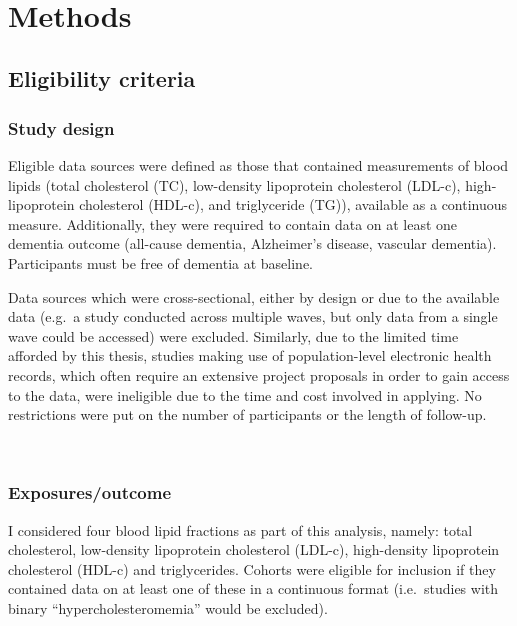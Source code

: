 \documentclass[a4paper, twoside]{templates/ociamthesis}
\begin{document}
~

\hypertarget{methods-2}{%
\section{Methods}\label{methods-2}}

\hypertarget{eligibility-criteria}{%
\subsection{Eligibility criteria}\label{eligibility-criteria}}

\hypertarget{study-design}{%
\subsubsection{Study design}\label{study-design}}

Eligible data sources were defined as those that contained measurements of blood lipids (total cholesterol (TC), low-density lipoprotein cholesterol (LDL-c), high-lipoprotein cholesterol (HDL-c), and triglyceride (TG)), available as a continuous measure. Additionally, they were required to contain data on at least one dementia outcome (all-cause dementia, Alzheimer's disease, vascular dementia). Participants must be free of dementia at baseline.

Data sources which were cross-sectional, either by design or due to the available data (e.g.~a study conducted across multiple waves, but only data from a single wave could be accessed) were excluded. Similarly, due to the limited time afforded by this thesis, studies making use of population-level electronic health records, which often require an extensive project proposals in order to gain access to the data, were ineligible due to the time and cost involved in applying. No restrictions were put on the number of participants or the length of follow-up.

~

\hypertarget{exposuresoutcome}{%
\subsubsection{Exposures/outcome}\label{exposuresoutcome}}

I considered four blood lipid fractions as part of this analysis, namely: total cholesterol, low-density lipoprotein cholesterol (LDL-c), high-density lipoprotein cholesterol (HDL-c) and triglycerides. Cohorts were eligible for inclusion if they contained data on at least one of these in a continuous format (i.e.~studies with binary ``hypercholesteromemia'' would be excluded).
\end{document}
